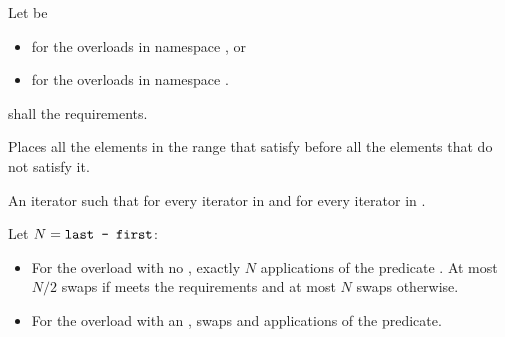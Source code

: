 \begin{itemdescr}
\begin{newnewblock}
\pnum
Let  be
\begin{itemize}
\item {} for the overloads in namespace , or
\item {} for the overloads in
  namespace .
\end{itemize}
\end{newnewblock}

\pnum
\requires
{}  shall 
 the
 requirements.

\pnum
\effects Places all the elements in the range  that satisfy
  before all the elements that
do not satisfy it.

\pnum
\returns An iterator  such that
for every iterator  in  
and  for every iterator  in
 .

\pnum
\complexity Let $N = \texttt{last - first}$:
\begin{itemize}
\item For the overload with no ,
exactly $N$ applications of the predicate .
At most $N / 2$ swaps if  meets the
 requirements  and at most $N$ swaps otherwise.
\item For the overload with an ,
 swaps and  applications of the predicate.
\end{itemize}
\end{itemdescr}

